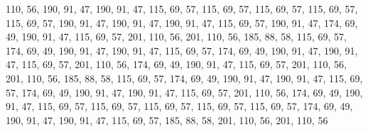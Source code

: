 110, 56, 190, 91, 47, 190, 91, 47, 115, 69, 57, 115, 69, 57, 115, 69,
57, 115, 69, 57, 115, 69, 57, 190, 91, 47, 190, 91, 47, 190, 91, 47,
115, 69, 57, 190, 91, 47, 174, 69, 49, 190, 91, 47, 115, 69, 57, 201,
110, 56, 201, 110, 56, 185, 88, 58, 115, 69, 57, 174, 69, 49, 190, 91,
47, 190, 91, 47, 115, 69, 57, 174, 69, 49, 190, 91, 47, 190, 91, 47,
115, 69, 57, 201, 110, 56, 174, 69, 49, 190, 91, 47, 115, 69, 57, 201,
110, 56, 201, 110, 56, 185, 88, 58, 115, 69, 57, 174, 69, 49, 190, 91,
47, 190, 91, 47, 115, 69, 57, 174, 69, 49, 190, 91, 47, 190, 91, 47,
115, 69, 57, 201, 110, 56, 174, 69, 49, 190, 91, 47, 115, 69, 57, 115,
69, 57, 115, 69, 57, 115, 69, 57, 115, 69, 57, 174, 69, 49, 190, 91,
47, 190, 91, 47, 115, 69, 57, 185, 88, 58, 201, 110, 56, 201, 110, 56
